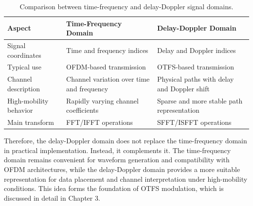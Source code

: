 \begin{table}[H]
\centering
\caption{Comparison between time-frequency and delay-Doppler signal domains.}
\label{tab:signal_domain_relationship}

\renewcommand{\arraystretch}{1.35}
\begin{tabularx}{\textwidth}{|
>{\RaggedRight\arraybackslash}p{3.0cm}|
>{\RaggedRight\arraybackslash}X|
>{\RaggedRight\arraybackslash}X|}
\hline
\textbf{Aspect} &
\textbf{Time-Frequency Domain} &
\textbf{Delay-Doppler Domain} \\
\hline

Signal coordinates &
Time and frequency indices &
Delay and Doppler indices \\
\hline

Typical use &
OFDM-based transmission &
OTFS-based transmission \\
\hline

Channel description &
Channel variation over time and frequency &
Physical paths with delay and Doppler shift \\
\hline

High-mobility behavior &
Rapidly varying channel coefficients &
Sparse and more stable path representation \\
\hline

Main transform &
FFT/IFFT operations &
SFFT/ISFFT operations \\
\hline

\end{tabularx}
\end{table}

Therefore, the delay-Doppler domain does not replace the time-frequency domain in practical implementation. Instead, it complements it. The time-frequency domain remains convenient for waveform generation and compatibility with OFDM architectures, while the delay-Doppler domain provides a more suitable representation for data placement and channel interpretation under high-mobility conditions. This idea forms the foundation of OTFS modulation, which is discussed in detail in Chapter 3.
